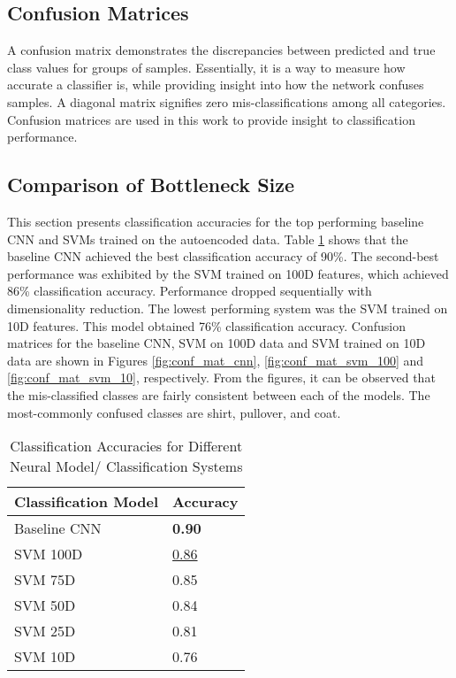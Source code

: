 \documentclass[conference]{IEEEtran}
\begin{document}
\subsection{Confusion Matrices}

A confusion matrix demonstrates the discrepancies between predicted and true class values for groups of samples.  Essentially, it is a way to measure how accurate a classifier is, while providing insight into how the network confuses samples.  A diagonal matrix signifies zero mis-classifications among all categories.  Confusion matrices are used in this work to provide insight to classification performance.

\subsection{Comparison of Bottleneck Size} \label{classification_accuracy}
This section presents classification accuracies for the top performing baseline CNN and SVMs trained on the autoencoded data.  Table \ref{tab:step1comparison} shows that the baseline CNN achieved the best classification accuracy of 90\%.  The second-best performance was exhibited by the SVM trained on 100D features, which achieved 86\% classification accuracy.  Performance dropped sequentially with dimensionality reduction.  The lowest performing system was the SVM trained on 10D features.  This model obtained 76\% classification accuracy.  Confusion matrices for the baseline CNN, SVM on 100D data and SVM trained on 10D data are shown in Figures \ref{fig:conf_mat_cnn}, \ref{fig:conf_mat_svm_100} and \ref{fig:conf_mat_svm_10}, respectively.
From the figures, it can be observed that the mis-classified classes are fairly consistent between each of the models.  The most-commonly confused classes are shirt, pullover, and coat.

\begin{table}[h!]
	\caption{Classification Accuracies for Different Neural Model/ Classification Systems}
	\label{tab:step1comparison}
	\normalsize
		\begin{tabularx}{\columnwidth}{ |X|X| } 
			\hline
			\centering \textbf{Classification Model}  & \textbf{Accuracy} \\
			\hline
			\centering Baseline CNN & \textbf{0.90} \\
			\hline
			\centering SVM 100D & \underline{0.86} \\
			\hline
			\centering SVM 75D & 0.85 \\
			\hline
			\centering SVM 50D & 0.84 \\
			\hline
			\centering SVM 25D & 0.81 \\
			\hline
			\centering SVM 10D & 0.76 \\
			\hline
		\end{tabularx}
\end{table} 
 
\end{document}
